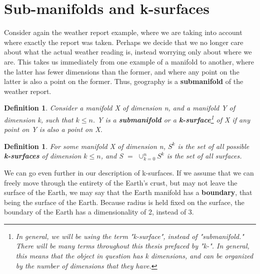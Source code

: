 \documentclass{book}
\newtheorem{defn}[equation]{Definition}
\begin{document}
\section{Sub-manifolds and k-surfaces}

Consider again the weather report example, where we are taking into account where exactly the report was taken. Perhaps we decide that we no longer care about what the actual weather reading is, instead worrying only about where we are. This takes us immediately from one example of a manifold to another, where the latter has fewer dimensions than the former, and where any point on the latter is also a point on the former. Thus, geography is a \textbf{submanifold} of the weather report.


\begin{defn}
	Consider a manifold X of dimension n, and a manifold Y of dimension k, such that $k \leq n$. Y is a \textbf{submanifold} or a \textbf{k-surface}\footnote{In general, we will be using the term "k-surface", instead of "submanifold." There will be many terms throughout this thesis prefaced by "k-". In general, this means that the object in question has k dimensions, and can be organized by the number of dimensions that they have.} of X if any point on Y is also a point on X. 
\end{defn}




\begin{defn}
	For some manifold X of dimension n, $S^k$ is the set of all possible \textbf{k-surfaces} of dimension $k \leq n$, and S $=$ $\cup^n_{k=0}S^k$ is the set of all surfaces. 
\end{defn}

We can go even further in our description of k-surfaces. If we assume that we can freely move through the entirety of the Earth's crust, but may not leave the surface of the Earth, we may say that the Earth manifold has a \textbf{boundary}, that being the surface of the Earth. Because radius is held fixed on the surface, the boundary of the Earth has a dimensionality of 2, instead of 3. 
\end{document}
